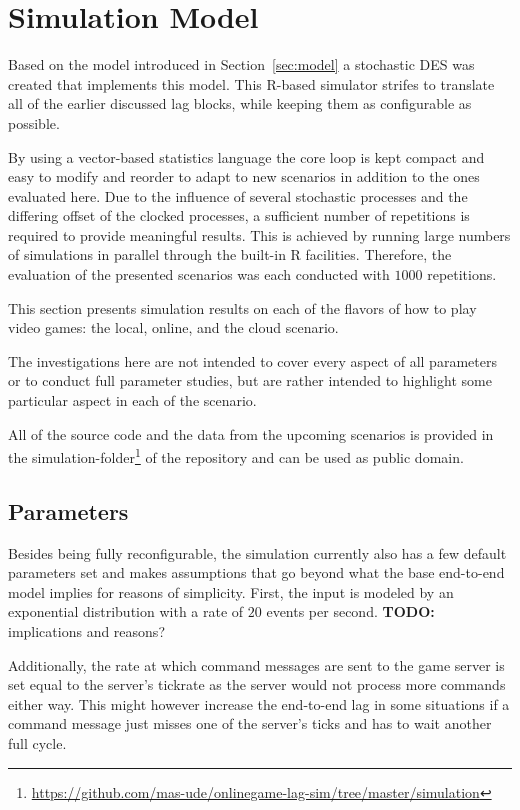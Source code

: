 \section{Simulation Model}
\label{sec:simulation}

Based on the model introduced in Section~\ref{sec:model} a stochastic \gls{DES} was created that implements this model. This R-based simulator strifes to translate all of the earlier discussed lag blocks, while keeping them as configurable as possible.

By using a vector-based statistics language the core loop is kept compact and easy to modify and reorder to adapt to new scenarios in addition to the ones evaluated here. Due to the influence of several stochastic processes and the differing offset of the clocked processes, a sufficient number of repetitions is required to provide meaningful results. This is achieved by running large numbers of simulations in parallel through the built-in R facilities. Therefore, the evaluation of the presented scenarios was each conducted with $1000$ repetitions.

This section presents simulation results on each of the flavors of how to play video games: the local, online, and the cloud scenario.

The investigations here are not intended to cover every aspect of all parameters or to conduct full parameter studies, but are rather intended to highlight some particular aspect in each of the scenario. 

All of the source code and the data from the upcoming scenarios is provided in the simulation-folder\footnote{\url{https://github.com/mas-ude/onlinegame-lag-sim/tree/master/simulation}} of the repository and can be used as public domain.


\subsection{Parameters}

Besides being fully reconfigurable, the simulation currently also has a few default parameters set and makes assumptions that go beyond what the base end-to-end model implies for reasons of simplicity.
First, the input is modeled by an exponential distribution with a rate of $20$ events per second. \textbf{TODO:} implications and reasons?

Additionally, the rate at which command messages are sent to the game server is set equal to the server's tickrate as the server would not process more commands either way. This might however increase the end-to-end lag in some situations if a command message just misses one of the server's ticks and has to wait another full cycle.


